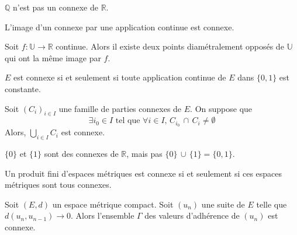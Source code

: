 	\begin{example}
		$\mathbb{Q}$ n'est pas un connexe de $\mathbb{R}$.
	\end{example}
	
	\begin{proposition}
		L'image d'un connexe par une application continue est connexe.
	\end{proposition}
	
	
	\begin{application}
		Soit $f : \mathbb{U} \rightarrow \mathbb{R}$ continue. Alors il existe deux points diamétralement opposés de $\mathbb{U}$ qui ont la même image par $f$.
	\end{application}
	
	
	\begin{corollary}
		$E$ est connexe si et seulement si toute application continue de $E$ dans $\{ 0, 1 \}$ est constante.
	\end{corollary}
	
	\begin{proposition}
		Soit $(C_i)_{i \in I}$ une famille de parties connexes de $E$. On suppose que
		\[ \exists i_0 \in I \text{ tel que } \forall i \in I, \, C_{i_0} \, \cap \, C_i \neq \emptyset \]
		Alors, $\bigcup_{i \in I} C_i$ est connexe.
	\end{proposition}
	
	\begin{cexample}
		$\{ 0 \}$ et $\{ 1 \}$ sont des connexes de $\mathbb{R}$, mais pas $\{ 0 \} \, \cup \, \{ 1 \} = \{ 0, 1 \}$.
	\end{cexample}
	
	\begin{proposition}
		Un produit fini d'espaces métriques est connexe si et seulement si ces espaces métriques sont tous connexes.
	\end{proposition}
	
	
	\begin{application}
		Soit $(E, d)$ un espace métrique compact. Soit $(u_n)$ une suite de $E$ telle que $d(u_n,u_{n-1}) \longrightarrow 0$. Alors l'ensemble $\Gamma$ des valeurs d'adhérence de $(u_n)$ est connexe.
	\end{application}
	
	
